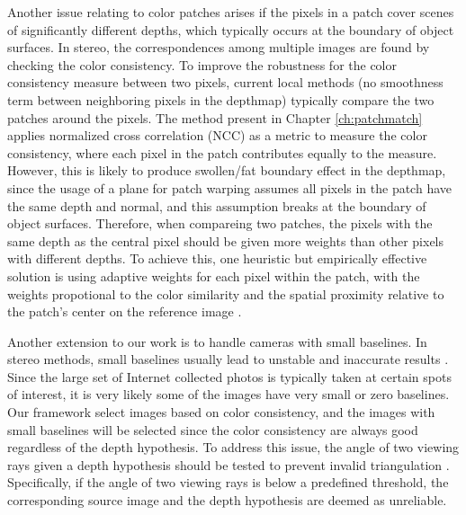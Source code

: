 Another issue relating to color patches arises if the pixels in a patch cover scenes of significantly different depths, which typically occurs at the boundary of object surfaces. 
In stereo, the correspondences among multiple images are found by checking the color consistency.
To improve the robustness for the color consistency measure between two pixels, current local methods (\ie no smoothness term between neighboring pixels in the depthmap) typically compare the two patches around the pixels. The method present in Chapter \ref{ch:patchmatch} applies normalized cross correlation (NCC) as a metric to measure the color consistency, where each pixel in the patch contributes equally to the measure. 
However, this is likely to produce swollen/fat boundary effect in the depthmap, since the usage of a plane for patch warping assumes all pixels in the patch have the same depth and normal, and this assumption breaks at the boundary of object surfaces. 
Therefore, when compareing two patches, the pixels with the same depth as the central pixel should be given more weights than other pixels with different depths. To achieve this, one heuristic but empirically effective solution is using adaptive weights for each pixel within the patch, with the weights propotional to the color similarity and the spatial proximity relative to the patch's center on the reference image \cite{Yoon06adaptivesupport_weight}. 

Another extension to our work is to handle cameras with small baselines. In stereo methods, small baselines usually lead to unstable and inaccurate results \cite{Hartley2004}. Since the large set of Internet collected photos is typically taken at certain spots of interest, it is very likely some of the images have very small or zero baselines. Our framework select images based on color consistency, and the images with small baselines will be selected since the color consistency are always good regardless of the depth hypothesis. To address this issue, the angle of two viewing rays given a depth hypothesis should be tested to prevent invalid triangulation \cite{Gallup08}. Specifically, if the angle of two viewing rays is below a predefined threshold, the corresponding source image and the depth hypothesis are deemed as unreliable.

